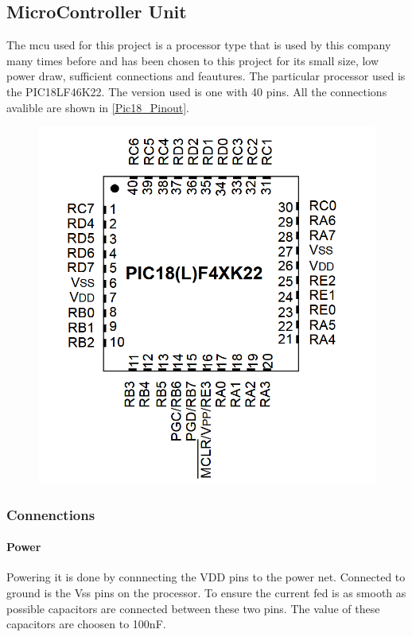 

\newpage
\subsection{MicroController Unit}
The \gls{mcu} used for this project is a processor type that is used by this company many times before and has been chosen to this project for its small size, low power draw, sufficient connections and feautures. The particular processor used is the PIC18LF46K22\cite{pic18}. The version used is one with 40 pins. All the connections avalible are shown in \autoref{Pic18_Pinout}.

\begin{figure}[H] 
\centering 
\includegraphics[width=.7\linewidth]{Figures/Pic18_pinout} 
\label{Pic18_Pinout} 
\end{figure} 

\subsubsection{Connenctions}

\paragraph{Power}
Powering it is done by connnecting the VDD pins to the power net. Connected to ground is the Vss pins on the processor. To ensure the current fed is as smooth as possible capacitors are connected between these two pins. The value of these capacitors are choosen to 100nF.  

